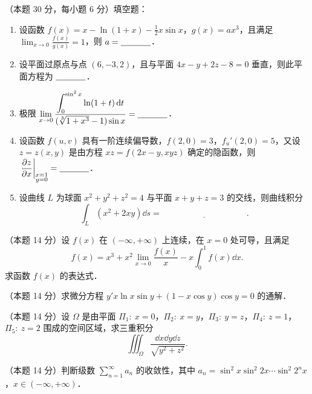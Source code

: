 
\begin{problems}
\item[一、]（本题 30 分，每小题 6 分）填空题：
\begin{enumerate}
  \item 设函数 $f(x)=x-\ln(1+x)-\frac{1}{2}x\sin x$，$g(x)=ax^3$，且满足 $\displaystyle \lim_{x\to 0}\frac{f(x)}{g(x)}=1$，则 $a=\underline{\hspace{3.5em}}$．
  \item 设平面过原点与点 $(6,-3,2)$，且与平面 $4x-y+2z-8=0$ 垂直，则此平面方程为 $\underline{\hspace{3.5em}}$．
  \item 极限 $\displaystyle \lim_{x\to 0}\frac{\displaystyle \int_0^{\sin^2 x}\ln(1+t)\,\mathrm{d} t}{(\sqrt[3]{1+x^3}-1)\sin x}=\underline{\hspace{3.5em}}$．
  \item 设函数 $f(u,v)$ 具有一阶连续偏导数，$f(2,0)=3$，$f_u'(2,0)=5$，又设 $z=z(x,y)$ 是由方程 $xz=f(2x-y,xyz)$ 确定的隐函数，则 $\displaystyle \left.\frac{\partial z}{\partial x}\right|_{\substack{x=1\\ y=0}}=\underline{\hspace{3.5em}}$．
  \item 设曲线 $L$ 为球面 $x^2+y^2+z^2=4$ 与平面 $x+y+z=3$ 的交线，则曲线积分
  \[
    \int_L (x^2+2xy)\dd s=\underline{\hspace{10em}}.
  \]
\end{enumerate}

\item[二、]（本题 14 分）设 $f(x)$ 在 $(-\infty,+\infty)$ 上连续，在 $x=0$ 处可导，且满足
\[
f(x)=x^3+x^2\lim_{x\to 0}\frac{f(x)}{x}-x\int_0^1 f(x)\dd x.
\]
求函数 $f(x)$ 的表达式．

\item[三、]（本题 14 分）求微分方程 $y'x\ln x\sin y+(1-x\cos y)\cos y=0$ 的通解．

\item[四、]（本题 14 分）设 $\Omega$ 是由平面 $\Pi_1:\ x=0$，$\Pi_2:\ x=y$，$\Pi_3:\ y=z$，$\Pi_4:\ z=1$，$\Pi_5:\ z=2$ 围成的空间区域，求三重积分
\[
\iiint_{\Omega}\frac{\dd x\dd y\dd z}{\sqrt{y^2+z^2}}.
\]

\item[五、]（本题 14 分）判断级数 $\displaystyle \sum_{n=1}^{\infty}a_n$ 的收敛性，其中 $a_n=\sin^2 x\sin^2 2x\cdots\sin^2 2^n x$，$x\in(-\infty,+\infty)$．


\end{problems}
